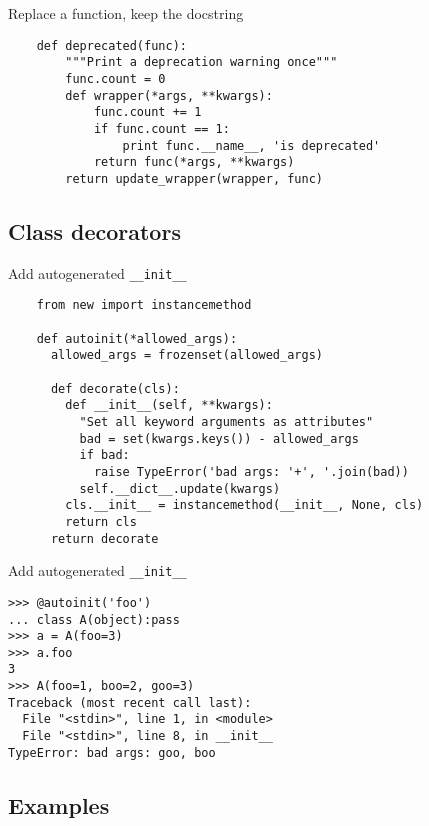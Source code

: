 \documentclass{beamer}
\begin{document}
\begin{frame}[fragile]{Replace a function, keep the docstring}
  \begin{verbatim}
    def deprecated(func):
        """Print a deprecation warning once"""
        func.count = 0
        def wrapper(*args, **kwargs):
            func.count += 1
            if func.count == 1:
                print func.__name__, 'is deprecated'
            return func(*args, **kwargs)
        return update_wrapper(wrapper, func)
  \end{verbatim}
\end{frame}

\subsection{Class decorators}

\begin{frame}[fragile]{Add autogenerated \texttt{\_\_init\_\_}}
  \begin{verbatim}
    from new import instancemethod

    def autoinit(*allowed_args):
      allowed_args = frozenset(allowed_args)

      def decorate(cls):
        def __init__(self, **kwargs):
          "Set all keyword arguments as attributes"
          bad = set(kwargs.keys()) - allowed_args
          if bad:
            raise TypeError('bad args: '+', '.join(bad))
          self.__dict__.update(kwargs)
        cls.__init__ = instancemethod(__init__, None, cls)
        return cls
      return decorate
  \end{verbatim}
\end{frame}

\begin{frame}[fragile]{Add autogenerated \texttt{\_\_init\_\_}}
  \begin{verbatim}
>>> @autoinit('foo')
... class A(object):pass
>>> a = A(foo=3)
>>> a.foo
3
>>> A(foo=1, boo=2, goo=3)
Traceback (most recent call last):
  File "<stdin>", line 1, in <module>
  File "<stdin>", line 8, in __init__
TypeError: bad args: goo, boo
  \end{verbatim}
\end{frame}

\subsection{Examples}
\end{document}
